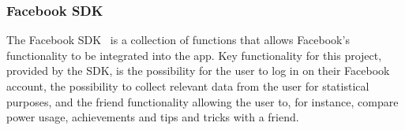 \subsubsection{Facebook SDK}
The Facebook SDK~\cite{fsdk} is a collection of functions that allows Facebook’s functionality to be integrated into the app. Key functionality for this project, 
provided by the SDK, is the possibility for the user to log in on their Facebook account, the possibility to collect relevant data from the user for statistical purposes, and the 
friend functionality allowing the user to, for instance, compare power usage, achievements and tips and tricks with a friend. 

